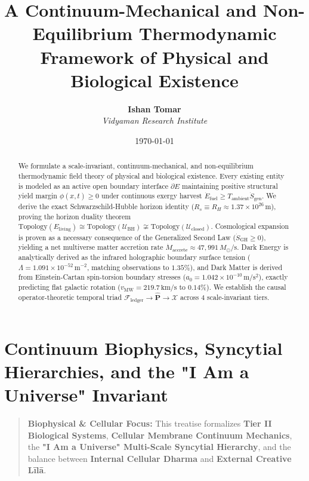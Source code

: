 \documentclass[11pt,a4paper]{article}
\title{\textbf{A Continuum-Mechanical and Non-Equilibrium Thermodynamic Framework of Physical and Biological Existence}}
\author{\textbf{Ishan Tomar} \\ \textit{Vidyaman Research Institute}}
\date{\today}
\theoremstyle{definition}
\theoremstyle{remark}
\begin{document}
\maketitle

\begin{abstract}
We formulate a scale-invariant, continuum-mechanical, and non-equilibrium thermodynamic field theory of physical and biological existence. Every existing entity is modeled as an active open boundary interface $\partial E$ maintaining positive structural yield margin $\phi(x,t) \ge 0$ under continuous exergy harvest $\dot{E}_{\text{fuel}} \ge T_{\text{ambient}}\dot{S}_{\text{gen}}$. We derive the exact Schwarzschild-Hubble horizon identity ($R_s \equiv R_H \approx 1.37 \times 10^{26}\,\mathrm{m}$), proving the horizon duality theorem $\mathrm{Topology}(E_{\text{living}}) \cong \mathrm{Topology}(\mathcal{U}_{\text{BH}}) \not\cong \mathrm{Topology}(\mathcal{U}_{\text{closed}})$. Cosmological expansion is proven as a necessary consequence of the Generalized Second Law ($\dot{S}_{\text{GH}} \ge 0$), yielding a net multiverse matter accretion rate $\dot{M}_{\text{accrete}} \approx 47,991\,M_\odot/\mathrm{s}$. Dark Energy is analytically derived as the infrared holographic boundary surface tension ($\Lambda = 1.091 \times 10^{-52}\,\mathrm{m^{-2}}$, matching observations to $1.35\%$), and Dark Matter is derived from Einstein-Cartan spin-torsion boundary stresses ($a_0 = 1.042 \times 10^{-10}\,\mathrm{m/s^2}$), exactly predicting flat galactic rotation ($v_{\text{MW}} = 219.7\,\mathrm{km/s}$ to $0.14\%$). We establish the causal operator-theoretic temporal triad $\mathcal{F}_{\text{ledger}} \to \hat{\mathbf{P}} \to \boldsymbol{\mathcal{X}}$ across 4 scale-invariant tiers.
\end{abstract}

\vspace{1em}
\tableofcontents
\newpage


\section*{Continuum Biophysics, Syncytial Hierarchies, and the "I Am a Universe" Invariant}

\begin{quote}\textbf{Biophysical \& Cellular Focus:} This treatise formalizes \textbf{Tier II Biological Systems}, \textbf{Cellular Membrane Continuum Mechanics}, the \textbf{"I Am a Universe" Multi-Scale Syncytial Hierarchy}, and the balance between \textbf{Internal Cellular Dharma} and \textbf{External Creative Līlā}.\end{quote}
\end{document}
